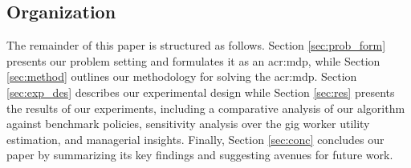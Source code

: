 \subsection{Organization}

The remainder of this paper is structured as follows. Section \ref{sec:prob_form} presents our problem setting and formulates it as an \gls{acr:mdp}, while Section \ref{sec:method} outlines our methodology for solving the  \gls{acr:mdp}. Section \ref{sec:exp_des} describes our experimental design while Section \ref{sec:res} presents the results of our experiments, including a comparative analysis of our algorithm against benchmark policies, sensitivity analysis over the gig worker utility estimation, and managerial insights. Finally, Section \ref{sec:conc} concludes our paper by summarizing its key findings and suggesting avenues for future work.
